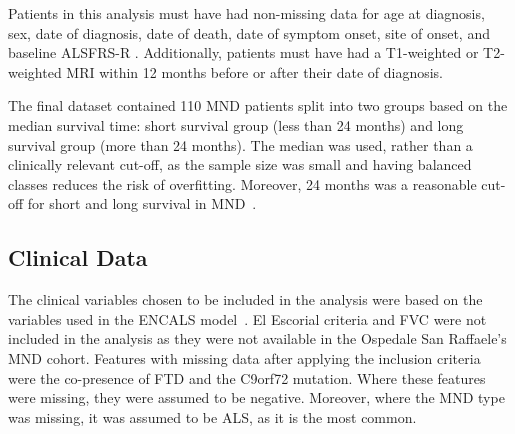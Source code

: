 Patients in this analysis must have had non-missing data for age at diagnosis, sex, date of diagnosis, date of death, date of symptom onset, site of onset, and baseline ALSFRS-R .
Additionally, patients must have had a T1-weighted or T2-weighted MRI within 12 months before or after their date of diagnosis.

The final dataset contained 110 MND patients split into two groups based on the median survival time: short survival group (less than 24 months) and long survival group (more than 24 months).
The median was used, rather than a clinically relevant cut-off, as the sample size was small and having balanced classes reduces the risk of overfitting.
Moreover, 24 months was a reasonable cut-off for short and long survival in MND~\cite{feldmanAmyotrophicLateralSclerosis2022}.

\subsection{Clinical Data}

The clinical variables chosen to be included in the analysis were based on the variables used in the ENCALS model~\cite{westenengPrognosisPatientsAmyotrophic2018}.
El Escorial criteria and FVC were not included in the analysis as they were not available in the Ospedale San Raffaele's MND cohort.
Features with missing data after applying the inclusion criteria were the co-presence of FTD and the C9orf72 mutation.
Where these features were missing, they were assumed to be negative.
Moreover, where the MND type was missing, it was assumed to be ALS, as it is the most common.


